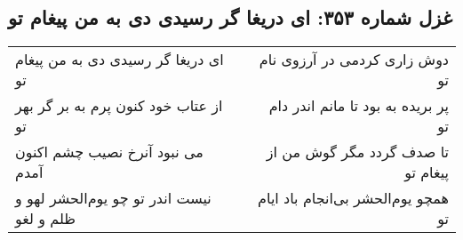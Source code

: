 \begin{center}
\section*{غزل شماره ۳۵۳: ای دریغا گر رسیدی دی به من پیغام تو}
\label{sec:353}
\begin{longtable}{l p{0.5cm} r}
ای دریغا گر رسیدی دی به من پیغام تو
&&
دوش زاری کردمی در آرزوی نام تو
\\
از عتاب خود کنون پرم به بر گر بهر تو
&&
پر بریده به بود تا مانم اندر دام تو
\\
می نبود آنرخ نصیب چشم اکنون آمدم
&&
تا صدف گردد مگر گوش من از پیغام تو
\\
نیست اندر تو چو یوم‌الحشر لهو و ظلم و لغو
&&
همچو یوم‌الحشر بی‌انجام باد ایام تو
\\
\end{longtable}
\end{center}
